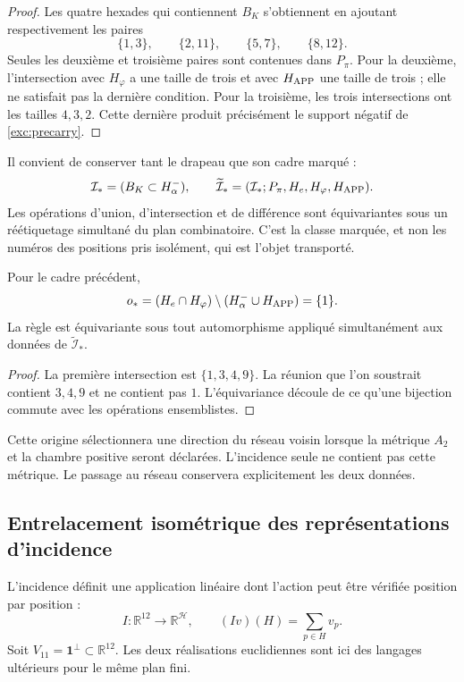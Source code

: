 \begin{proof}
Les quatre hexades qui contiennent $B_K$ s'obtiennent en ajoutant respectivement les paires
\[
 \{1,3\},\qquad\{2,11\},\qquad\{5,7\},\qquad\{8,12\}.
\]
Seules les deuxième et troisième paires sont contenues dans $P_\pi$. Pour la
deuxième, l'intersection avec $H_\varphi$ a une taille de trois et avec
$H_{\rm APP}$ une taille de trois ; elle ne satisfait pas la dernière condition. Pour la
troisième, les trois intersections ont les tailles $4,3,2$. Cette dernière
produit précisément le support négatif de \eqref{exc:precarry}.
\end{proof}

Il convient de conserver tant le drapeau que son cadre marqué :
\[
 \mathcal I_*=(B_K\subset H^-_\alpha),\qquad
 \widetilde{\mathcal I}_*
   =(\mathcal I_*;P_\pi,H_e,H_\varphi,H_{\rm APP}).
\]
Les opérations d'union, d'intersection et de différence sont équivariantes sous un réétiquetage simultané du plan combinatoire. C'est la classe marquée, et non les numéros des positions pris isolément, qui est l'objet transporté.

\begin{lemma}
\label{exc:origen}
Pour le cadre précédent,
\[
 o_*=(H_e\cap H_\varphi)
           \setminus(H^-_\alpha\cup H_{\rm APP})=\{1\}.
\]
La règle est équivariante sous tout automorphisme appliqué simultanément
aux données de $\widetilde{\mathcal I}_*$.
\end{lemma}

\begin{proof}
La première intersection est $\{1,3,4,9\}$. La réunion que l'on soustrait
contient $3,4,9$ et ne contient pas $1$. L'équivariance découle de ce qu'une
bijection commute avec les opérations ensemblistes.
\end{proof}

Cette origine sélectionnera une direction du réseau voisin lorsque la métrique $A_2$ et la chambre positive seront déclarées. L'incidence seule ne contient pas cette métrique. Le passage au réseau conservera explicitement les deux données.

\subsection{Entrelacement isométrique des représentations d'incidence}
\label{exc:entrelazador}

L'incidence définit une application linéaire dont l'action peut être vérifiée
position par position :
\begin{equation}
 I:\mathbb R^{12}\longrightarrow\mathbb R^{\mathcal H},
 \qquad (Iv)(H)=\sum_{p\in H}v_p.
 \label{exc:incidencia}
\end{equation}
Soit $V_{11}=\mathbf1^\perp\subset\mathbb R^{12}$. Les deux réalisations
euclidiennes sont ici des langages ultérieurs pour le même plan fini.

